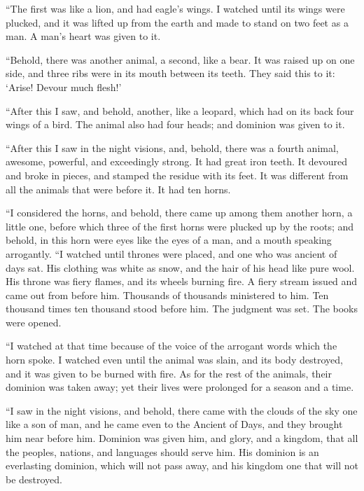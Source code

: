  ``The first was like a lion, and had eagle's wings. I
watched until its wings were plucked, and it was lifted up from the
earth and made to stand on two feet as a man. A man's heart was given to
it.

 ``Behold, there was another animal, a second, like a bear.
It was raised up on one side, and three ribs were in its mouth between
its teeth. They said this to it: `Arise! Devour much flesh!'

 ``After this I saw, and behold, another, like a leopard,
which had on its back four wings of a bird. The animal also had four
heads; and dominion was given to it.

 ``After this I saw in the night visions, and, behold, there
was a fourth animal, awesome, powerful, and exceedingly strong. It had
great iron teeth. It devoured and broke in pieces, and stamped the
residue with its feet. It was different from all the animals that were
before it. It had ten horns.

 ``I considered the horns, and behold, there came up among
them another horn, a little one, before which three of the first horns
were plucked up by the roots; and behold, in this horn were eyes like
the eyes of a man, and a mouth speaking arrogantly.  ``I
watched until thrones were placed, and one who was ancient of days sat.
His clothing was white as snow, and the hair of his head like pure wool.
His throne was fiery flames, and its wheels burning fire. 
A fiery stream issued and came out from before him. Thousands of
thousands ministered to him. Ten thousand times ten thousand stood
before him. The judgment was set. The books were opened.

 ``I watched at that time because of the voice of the
arrogant words which the horn spoke. I watched even until the animal was
slain, and its body destroyed, and it was given to be burned with fire.
 As for the rest of the animals, their dominion was taken
away; yet their lives were prolonged for a season and a time.

 ``I saw in the night visions, and behold, there came with
the clouds of the sky one like a son of man, and he came even to the
Ancient of Days, and they brought him near before him. 
Dominion was given him, and glory, and a kingdom, that all the peoples,
nations, and languages should serve him. His dominion is an everlasting
dominion, which will not pass away, and his kingdom one that will not be
destroyed.

